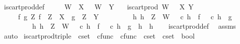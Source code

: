 \begin{isabellebody}
\isanewline
{}\isamarkupfalse%
\ is{\isacharunderscore}{\kern0pt}cart{\isacharunderscore}{\kern0pt}prod{\isacharunderscore}{\kern0pt}def{}{\isacharcolon}{\kern0pt}\isanewline
\ \ \ {\isachardoublequoteopen}{\isasympi}\ {\isacharcolon}{\kern0pt}\ W\ {\isasymrightarrow}\ X{\isachardoublequoteclose}\ {\isachardoublequoteopen}{\isasympi}\ {\isacharcolon}{\kern0pt}\ W\ {\isasymrightarrow}\ Y{\isachardoublequoteclose}\isanewline
\ \ \ {\isachardoublequoteopen}is{\isacharunderscore}{\kern0pt}cart{\isacharunderscore}{\kern0pt}prod\ W\ {\isasympi}\ {\isasympi}\ X\ Y\ {\isasymlongleftrightarrow}\ \isanewline
\ \ \ \ {\isacharparenleft}{\kern0pt}{\isasymforall}\ f\ g\ Z{\isachardot}{\kern0pt}\ {\isacharparenleft}{\kern0pt}f\ {\isacharcolon}{\kern0pt}\ Z\ {\isasymrightarrow}\ X\ {\isasymand}\ g\ {\isacharcolon}{\kern0pt}\ Z\ {\isasymrightarrow}\ Y{\isacharparenright}{\kern0pt}\ {\isasymlongrightarrow}\ \isanewline
\ \ \ \ \ \ {\isacharparenleft}{\kern0pt}{\isasymexists}\ h{\isachardot}{\kern0pt}\ h\ {\isacharcolon}{\kern0pt}\ Z\ {\isasymrightarrow}\ W\ {\isasymand}\ {\isasympi}\ {\isasymcirc}\isactrlsub c\ h\ {\isacharequal}{\kern0pt}\ f\ {\isasymand}\ {\isasympi}\ {\isasymcirc}\isactrlsub c\ h\ {\isacharequal}{\kern0pt}\ g\ {\isasymand}\isanewline
\ \ \ \ \ \ \ \ {\isacharparenleft}{\kern0pt}{\isasymforall}\ h{}{\isachardot}{\kern0pt}\ {\isacharparenleft}{\kern0pt}h{}\ {\isacharcolon}{\kern0pt}\ Z\ {\isasymrightarrow}\ W\ {\isasymand}\ {\isasympi}\ {\isasymcirc}\isactrlsub c\ h{}\ {\isacharequal}{\kern0pt}\ f\ {\isasymand}\ {\isasympi}\ {\isasymcirc}\isactrlsub c\ h{}\ {\isacharequal}{\kern0pt}\ g{\isacharparenright}{\kern0pt}\ {\isasymlongrightarrow}\ h{}\ {\isacharequal}{\kern0pt}\ h{\isacharparenright}{\kern0pt}{\isacharparenright}{\kern0pt}{\isacharparenright}{\kern0pt}{\isachardoublequoteclose}\isanewline
%
\isadelimproof
\ \ %
\endisadelimproof
%
\isatagproof
{}\isamarkupfalse%
\ is{\isacharunderscore}{\kern0pt}cart{\isacharunderscore}{\kern0pt}prod{\isacharunderscore}{\kern0pt}def\ \isamarkupfalse%
\ assms\ \isamarkupfalse%
\ auto%
\endisatagproof
{\isafoldproof}%
%
\isadelimproof
\isanewline
%
\endisadelimproof
\isanewline
{}\isamarkupfalse%
\ is{\isacharunderscore}{\kern0pt}cart{\isacharunderscore}{\kern0pt}prod{\isacharunderscore}{\kern0pt}triple\ {\isacharcolon}{\kern0pt}{\isacharcolon}{\kern0pt}\ {\isachardoublequoteopen}cset\ {\isasymtimes}\ cfunc\ {\isasymtimes}\ cfunc\ {\isasymRightarrow}\ cset\ {\isasymRightarrow}\ cset\ {\isasymRightarrow}\ bool{\isachardoublequoteclose}\ \isanewline

\end{isabellebody}
